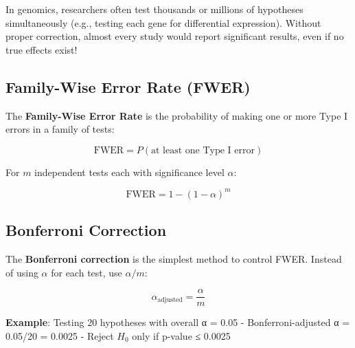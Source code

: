 \documentclass[
  11pt,
  letterpaper,
  oneside]{book}
\begin{document}
\begin{tcolorbox}[enhanced jigsaw, toprule=.15mm, left=2mm, opacitybacktitle=0.6, colframe=quarto-callout-warning-color-frame, leftrule=.75mm, titlerule=0mm, coltitle=black, colbacktitle=quarto-callout-warning-color!10!white, toptitle=1mm, title=\textcolor{quarto-callout-warning-color}{\faExclamationTriangle}\hspace{0.5em}{The Multiple Testing Crisis}, bottomtitle=1mm, arc=.35mm, rightrule=.15mm, bottomrule=.15mm, breakable, opacityback=0, colback=white]

In genomics, researchers often test thousands or millions of hypotheses
simultaneously (e.g., testing each gene for differential expression).
Without proper correction, almost every study would report significant
results, even if no true effects exist!

\end{tcolorbox}

\subsection{Family-Wise Error Rate
(FWER)}\label{family-wise-error-rate-fwer}

The \textbf{Family-Wise Error Rate} is the probability of making one or
more Type I errors in a family of tests:

\[\text{FWER} = P(\text{at least one Type I error})\]

For \(m\) independent tests each with significance level \(\alpha\):

\[\text{FWER} = 1 - (1-\alpha)^m\]

\subsection{Bonferroni Correction}\label{bonferroni-correction}

The \textbf{Bonferroni correction} is the simplest method to control
FWER. Instead of using \(\alpha\) for each test, use \(\alpha/m\):

\[\alpha_{\text{adjusted}} = \frac{\alpha}{m}\]

\textbf{Example}: Testing 20 hypotheses with overall α = 0.05 -
Bonferroni-adjusted α = 0.05/20 = 0.0025 - Reject \(H_0\) only if
p-value ≤ 0.0025
\end{document}
